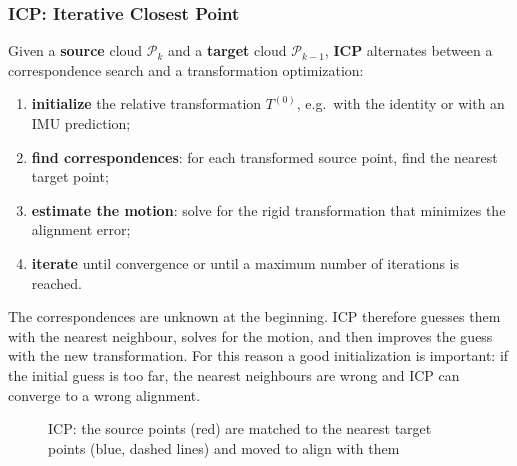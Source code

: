 \subsubsection{ICP: Iterative Closest Point}
Given a \textbf{source} cloud $\mathcal{P}_k$ and a \textbf{target} cloud $\mathcal{P}_{k-1}$, \textbf{ICP} alternates between a correspondence search and a transformation optimization:
\begin{enumerate}
    \item \textbf{initialize} the relative transformation $T^{(0)}$, e.g.\ with the identity or with an IMU prediction;
    \item \textbf{find correspondences}: for each transformed source point, find the nearest target point;
    \item \textbf{estimate the motion}: solve for the rigid transformation that minimizes the alignment error;
    \item \textbf{iterate} until convergence or until a maximum number of iterations is reached.
\end{enumerate}
The correspondences are unknown at the beginning. ICP therefore guesses them with the nearest neighbour, solves for the motion, and then improves the guess with the new transformation. For this reason a good initialization is important: if the initial guess is too far, the nearest neighbours are wrong and ICP can converge to a wrong alignment.

\begin{figure}[H]
    \centering
    \caption{ICP: the source points (red) are matched to the nearest target points (blue, dashed lines) and moved to align with them}
\end{figure}

